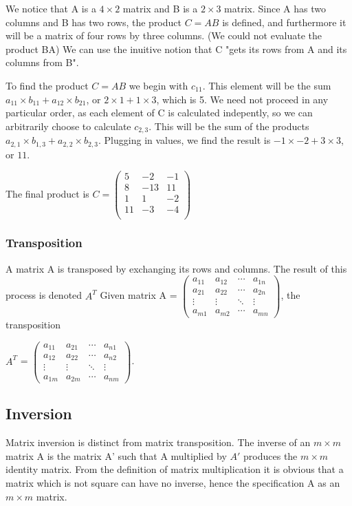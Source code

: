 \documentclass[12pt,letterpaper,final]{article}
\begin{document}
We notice that A is a $4 \times 2$ matrix and B is a $2 \times 3$ matrix. Since A has two columns and B has two rows, the product $C=AB$ is defined, and furthermore it will be a matrix of four rows by three columns. (We could not evaluate the product BA) We can use the inuitive notion that C "gets its rows from A and its columns from B". 

To find the product $C=AB$ we begin with $c_{11}$. This element will be the sum$a_{11} \times b_11 + a_{12} \times b_{21}$, or $2 \times 1 + 1 \times 3$, which is 5. We need not proceed in any particular order, as each element of C is calculated indepently, so we can arbitrarily choose to calculate $c_{2,3}$. This will be the sum of the products $a_{2,1} \times b_{1,3} + a_{2,2} \times b_{2,3}$. Plugging in values, we find the result is $-1 \times -2 + 3 \times 3$, or $11$.

The final product is $C = 
 \begin{pmatrix}
 5 & -2 & -1\\ 8 & -13 & 11\\ 1 & 1 & -2 \\ 11 & -3 & -4\\ 
 \end{pmatrix}
$


\subsubsection{Transposition}
A matrix A is transposed by exchanging its rows and columns. The result of this process is denoted $A^T$
Given matrix A = 
$
 \begin{pmatrix}
  a_{11} & a_{12} & \cdots & a_{1n} \\
  a_{21} & a_{22} & \cdots & a_{2n} \\
  \vdots  & \vdots  & \ddots & \vdots  \\
  a_{m1} & a_{m2} & \cdots & a_{mn}
 \end{pmatrix}
$, the transposition 

$A^T$ =
$
 \begin{pmatrix}
  a_{11} & a_{21} & \cdots & a_{n1} \\
  a_{12} & a_{22} & \cdots & a_{n2} \\
  \vdots  & \vdots  & \ddots & \vdots  \\
  a_{1m} & a_{2m} & \cdots & a_{nm}
 \end{pmatrix}
$.

\subsection{Inversion}
Matrix inversion is distinct from matrix transposition. The inverse of an $m \times m$ matrix A is the matrix A' such that A multiplied by $A'$ produces the $m \times m$ identity matrix. From the definition of matrix multiplication it is obvious that a matrix which is not square can have no inverse, hence the specification A as an $m \times m$ matrix. 
\end{document}
